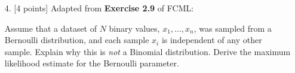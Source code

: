 \documentclass[10pt]{article}
\begin{document}
\begin{itemize}
{\bf Solution.}

Yes, the elements of $\mathbf{w}$ are independent.

\begin{eqnarray*}
\begin{aligned}
\mathbf{\Sigma} &= 
\begin{bmatrix}
\sigma_1^2 & 0 & \cdots & 0 \\
0 & \sigma_2^2 & \cdots & 0 \\
\vdots & \vdots & \ddots & \vdots \\
0 & 0 & \cdots & \sigma_D^2
\end{bmatrix}
\\
\mathbf{\Sigma}^{-1} &= 
\begin{bmatrix}
\frac{1}{\sigma_1^2} & 0 & \cdots & 0 \\
0 & \frac{1}{\sigma_2^2} & \cdots & 0 \\
\vdots & \vdots & \ddots & \vdots \\
0 & 0 & \cdots & \frac{1}{\sigma_D^2}
\end{bmatrix}
\\
p(\mathbf{w}) &= \frac{1}{(2 \pi)^{D/2} | \mathbf{\Sigma} |^{1/2}} \exp \left\{ -\frac{1}{2} (\mathbf{w} - \boldsymbol{\mu})^\top \mathbf{\Sigma}^{-1} (\mathbf{w} - \boldsymbol{\mu}) \right\} . \label{eqn:multnormal}
\\
&= \frac{1}{(2 \pi)^{D/2} | \mathbf{\Sigma} |^{1/2}} \exp 
\left\{ 
-\frac{1}{2} 
\sum_{d=1}^D 
\frac{1}{\sigma^2_d} (w_d - \mu_d)^2
\right\} 
\\
&= \frac{1}{(2 \pi)^{D/2} | \mathbf{\Sigma} |^{1/2}} \exp 
\left\{ 
-\frac{1}{2\sigma^2_d}
\sum_{d=1}^D 
(w_d - \mu_d)^2
\right\} 
\\
&= \frac{1}{(2 \pi)^{D/2} | \mathbf{\Sigma} |^{1/2}} 
\prod_{d=1}^D
\exp 
\left\{ 
-\frac{1}{2\sigma^2_d} 
(w_d - \mu_d)^2
\right\} 
\\
p(\mathbf{w}) &= 
\prod_{d=1}^D
\frac{1}{(2 \pi \sigma^2_d)^{1/2}}
\exp 
\left\{ 
-\frac{1}{2\sigma^2_d} 
(w_d - \mu_d)^2
\right\} 
\end{aligned}
\end{eqnarray*}


\item[4.] [4 points]
Adapted from {\bf Exercise 2.9} of FCML:

Assume that a dataset of $N$ binary values, $x_1, ..., x_n$, was sampled from a Bernoulli distribution, and each sample $x_i$ is independent of any other sample.  Explain why this is {\em not} a Binomial distribution.  Derive the maximum likelihood estimate for the Bernoulli parameter.


\end{itemize}
\end{document}
